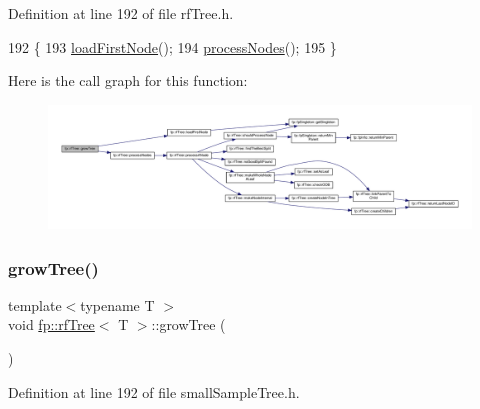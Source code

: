 Definition at line 192 of file rf\+Tree.\+h.


\begin{DoxyCode}
192                                \{
193                     \hyperlink{classfp_1_1rfTree_a8757adc28b68d0a99f95b8bc5d6a38db}{loadFirstNode}();
194                     \hyperlink{classfp_1_1rfTree_a7997df3477bc9f73163384c8cd0bcec9}{processNodes}();
195                 \}
\end{DoxyCode}
Here is the call graph for this function\+:
\nopagebreak
\begin{figure}[H]
\begin{center}
\leavevmode
\includegraphics[width=350pt]{classfp_1_1rfTree_a196d6006e7e2ee0575fa40d7d4621712_cgraph}
\end{center}
\end{figure}
\mbox{\label{classfp_1_1rfTree_a196d6006e7e2ee0575fa40d7d4621712}} 
\subsubsection{\texorpdfstring{grow\+Tree()}{growTree()}\hspace{0.1cm}{\footnotesize\ttfamily [2/2]}}
{\footnotesize\ttfamily template$<$typename T $>$ \\
void \hyperlink{classfp_1_1rfTree}{fp\+::rf\+Tree}$<$ T $>$\+::grow\+Tree (\begin{DoxyParamCaption}{ }\end{DoxyParamCaption})\hspace{0.3cm}{\ttfamily [inline]}}



Definition at line 192 of file small\+Sample\+Tree.\+h.


